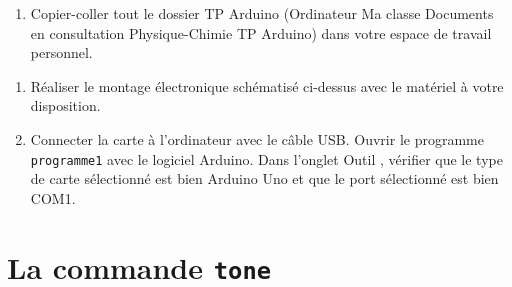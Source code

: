 \documentclass[12pt,a4paper]{article}
\begin{document}
\begin{enumerate}
\item \rea{}

Copier-coller tout le dossier \og TP Arduino \fg{} (Ordinateur \textrightarrow{} Ma classe \textrightarrow{} Documents en consultation \textrightarrow{} Physique-Chimie \textrightarrow{} TP Arduino) dans votre espace de travail personnel.
\end{enumerate}

\begin{enumerate}[resume]
\item \rea{}

Réaliser le montage électronique schématisé ci-dessus avec le matériel à votre disposition.

\item \rea{}

Connecter la carte à l'ordinateur avec le câble USB.
Ouvrir le programme \texttt{programme1} avec le logiciel Arduino.
Dans l'onglet \og Outil \fg{}, vérifier que le type de carte sélectionné est bien Arduino Uno et que le port sélectionné est bien COM1.
\end{enumerate}

\section*{La commande \texttt{tone}}
\end{document}
